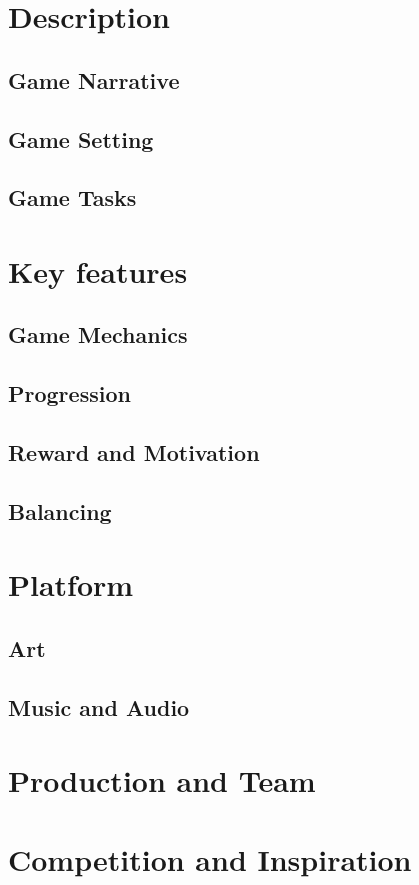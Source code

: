 \documentclass[12pt,journal,compsoc]{IEEEtran}
\begin{document}
\section{Description} 
\subsection{Game Narrative} 
\subsection{Game Setting} 
\subsection{Game Tasks} 

\section{Key features} 
\subsection{Game Mechanics} 
\subsection{Progression} 
\subsection{Reward and Motivation} 
\subsection{Balancing} 

\section{Platform} 
\subsection{Art} 
\subsection{Music and Audio}

\section{Production and Team} 
\section{Competition and Inspiration}


{}

\end{document}
